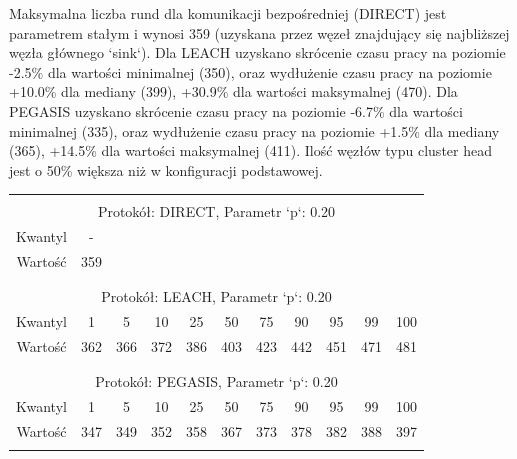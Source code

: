 \documentclass[a4paper,12pt,twoside,openany]{report}
\begin{document}
\par
Maksymalna liczba rund dla komunikacji bezpośredniej (DIRECT) jest parametrem stałym i wynosi 359 (uzyskana przez węzeł znajdujący się najbliższej węzła głównego `sink`).
Dla LEACH uzyskano skrócenie czasu pracy na poziomie -2.5\% dla wartości minimalnej (350), oraz wydłużenie czasu pracy na poziomie +10.0\% dla mediany (399), +30.9\% dla wartości maksymalnej (470).
Dla PEGASIS uzyskano skrócenie czasu pracy na poziomie -6.7\% dla wartości minimalnej (335), oraz wydłużenie czasu pracy na poziomie +1.5\% dla mediany (365), +14.5\% dla wartości maksymalnej (411).
Ilość węzłów typu cluster head jest o 50\% większa niż w konfiguracji podstawowej.

\begin{longtable}{*{11}{c}}
\toprule \\*
\multicolumn{11}{c}{Protokół: DIRECT, Parametr `p`: 0.20} \\*
Kwantyl	& -	\\*
Wartość	& 359	\\*
\midrule \\*
\\*
\multicolumn{11}{c}{Protokół: LEACH, Parametr `p`: 0.20} \\*
Kwantyl	& 1	& 5	& 10	& 25	& 50	& 75	& 90	& 95	& 99	& 100	\\*
Wartość	& 362	& 366	& 372	& 386	& 403	& 423	& 442	& 451	& 471	& 481	\\*
\midrule \\*
\\*
\multicolumn{11}{c}{Protokół: PEGASIS, Parametr `p`: 0.20} \\*
Kwantyl	& 1	& 5	& 10	& 25	& 50	& 75	& 90	& 95	& 99	& 100	\\*
Wartość	& 347	& 349	& 352	& 358	& 367	& 373	& 378	& 382	& 388	& 397	\\*	
\bottomrule \\*
\end{longtable}
\end{document}
